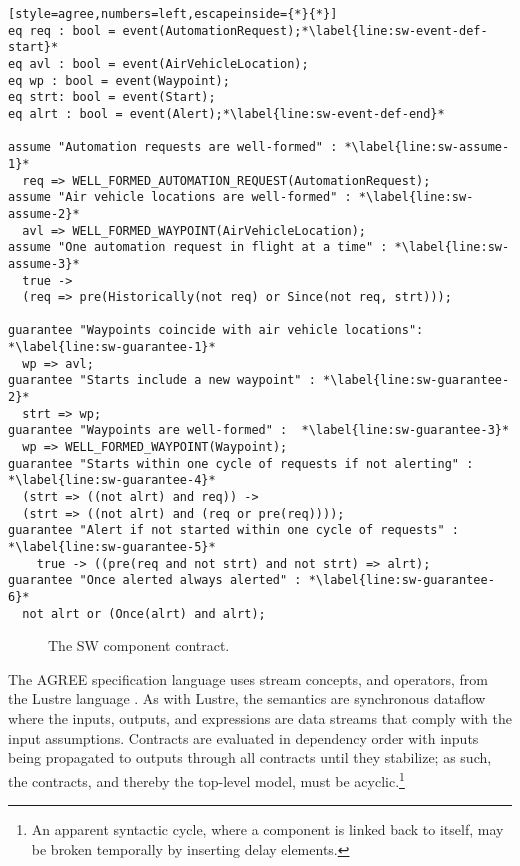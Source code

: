 \newsavebox{\sw}
\begin{lrbox}{\sw}
\begin{lstlisting}[style=agree,numbers=left,escapeinside={*}{*}]
eq req : bool = event(AutomationRequest);*\label{line:sw-event-def-start}*
eq avl : bool = event(AirVehicleLocation);
eq wp : bool = event(Waypoint);
eq strt: bool = event(Start);
eq alrt : bool = event(Alert);*\label{line:sw-event-def-end}*

assume "Automation requests are well-formed" : *\label{line:sw-assume-1}*
  req => WELL_FORMED_AUTOMATION_REQUEST(AutomationRequest);
assume "Air vehicle locations are well-formed" : *\label{line:sw-assume-2}*
  avl => WELL_FORMED_WAYPOINT(AirVehicleLocation);    
assume "One automation request in flight at a time" : *\label{line:sw-assume-3}*
  true -> 
  (req => pre(Historically(not req) or Since(not req, strt)));
      
guarantee "Waypoints coincide with air vehicle locations": *\label{line:sw-guarantee-1}*
  wp => avl;
guarantee "Starts include a new waypoint" : *\label{line:sw-guarantee-2}*
  strt => wp;
guarantee "Waypoints are well-formed" :  *\label{line:sw-guarantee-3}*
  wp => WELL_FORMED_WAYPOINT(Waypoint);
guarantee "Starts within one cycle of requests if not alerting" : *\label{line:sw-guarantee-4}*
  (strt => ((not alrt) and req)) -> 
  (strt => ((not alrt) and (req or pre(req))));
guarantee "Alert if not started within one cycle of requests" : *\label{line:sw-guarantee-5}*
    true -> ((pre(req and not strt) and not strt) => alrt);
guarantee "Once alerted always alerted" : *\label{line:sw-guarantee-6}*
  not alrt or (Once(alrt) and alrt);
\end{lstlisting}
\end{lrbox}

\begin{figure}
  \begin{center}
    \scalebox{0.62}{\usebox{\sw}}
  \end{center}
  \caption{The SW component contract.}
  \label{fig:sw}
\end{figure}

The AGREE specification language uses stream concepts, and operators, from the Lustre language \cite{10.1145/41625.41641}.
As with Lustre, the semantics are synchronous dataflow where the inputs, outputs, and expressions are data streams that comply with the input assumptions.
Contracts are evaluated in dependency order with inputs being propagated to outputs through all contracts until they stabilize; as such, the contracts, and thereby the top-level model, must be acyclic.\footnote{An apparent syntactic cycle, where a component is linked back to itself, may be broken temporally by inserting delay elements.}

